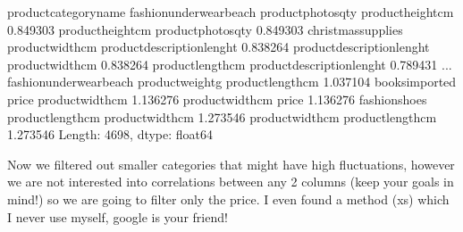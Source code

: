 \documentclass[letterpaper,10pt,english]{jupyterBook}
\begin{document}
\begin{sphinxVerbatim}[commandchars=\\\{\}]
product\PYGZus{}category\PYGZus{}name                                                          
fashion\PYGZus{}underwear\PYGZus{}beach  product\PYGZus{}photos\PYGZus{}qty          product\PYGZus{}height\PYGZus{}cm             0.849303
                         product\PYGZus{}height\PYGZus{}cm           product\PYGZus{}photos\PYGZus{}qty            0.849303
christmas\PYGZus{}supplies       product\PYGZus{}width\PYGZus{}cm            product\PYGZus{}description\PYGZus{}lenght    0.838264
                         product\PYGZus{}description\PYGZus{}lenght  product\PYGZus{}width\PYGZus{}cm              0.838264
                         product\PYGZus{}length\PYGZus{}cm           product\PYGZus{}description\PYGZus{}lenght    0.789431
                                                                                     ...   
fashion\PYGZus{}underwear\PYGZus{}beach  product\PYGZus{}weight\PYGZus{}g            product\PYGZus{}length\PYGZus{}cm            \PYGZhy{}1.037104
books\PYGZus{}imported           price                       product\PYGZus{}width\PYGZus{}cm             \PYGZhy{}1.136276
                         product\PYGZus{}width\PYGZus{}cm            price                        \PYGZhy{}1.136276
fashion\PYGZus{}shoes            product\PYGZus{}length\PYGZus{}cm           product\PYGZus{}width\PYGZus{}cm             \PYGZhy{}1.273546
                         product\PYGZus{}width\PYGZus{}cm            product\PYGZus{}length\PYGZus{}cm            \PYGZhy{}1.273546
Length: 4698, dtype: float64
\end{sphinxVerbatim}

\sphinxAtStartPar
Now we filtered out smaller categories that might have high fluctuations, however we are not interested into correlations between any 2 columns (keep your goals in mind!) so we are going to filter only the price. I even found a method (xs) which I never use myself, google is your friend!

\begin{sphinxVerbatim}[commandchars=\\\{\}]
  
\end{sphinxVerbatim}
\end{document}

